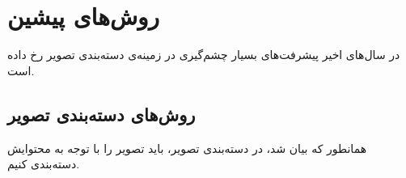 \chapter{روش‌های پیشین}\label{chap:chap2}
در سال‌های اخیر پیشرفت‌های بسیار چشم‌گیری در زمینه‌ی دسته‌بندی تصویر رخ داده است.

\section{روش‌های دسته‌بندی تصویر}\label{chap:2:sec1}
همانطور که بیان شد، در دسته‌بندی تصویر، باید تصویر را با توجه به محتوایش دسته‌بندی کنیم.
